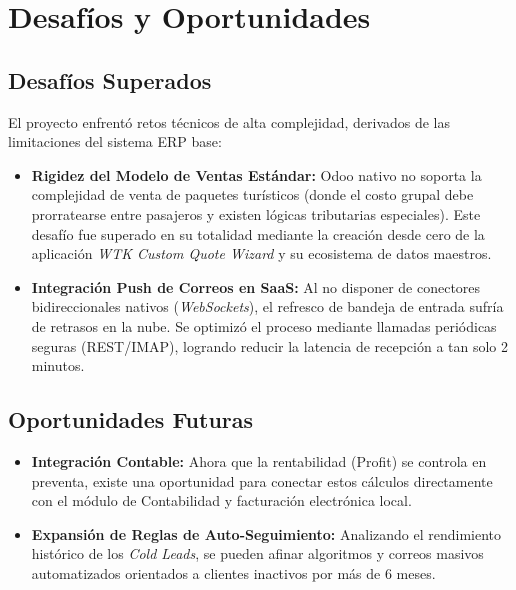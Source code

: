 \section{Desafíos y Oportunidades}

\subsection{Desafíos Superados}
El proyecto enfrentó retos técnicos de alta complejidad, derivados de las limitaciones del sistema ERP base:

\begin{itemize}
    \item \textbf{Rigidez del Modelo de Ventas Estándar:} Odoo nativo no soporta la complejidad de venta de paquetes turísticos (donde el costo grupal debe prorratearse entre pasajeros y existen lógicas tributarias especiales). Este desafío fue superado en su totalidad mediante la creación desde cero de la aplicación \textit{WTK Custom Quote Wizard} y su ecosistema de datos maestros.
    \item \textbf{Integración Push de Correos en SaaS:} Al no disponer de conectores bidireccionales nativos (\textit{WebSockets}), el refresco de bandeja de entrada sufría de retrasos en la nube. Se optimizó el proceso mediante llamadas periódicas seguras (REST/IMAP), logrando reducir la latencia de recepción a tan solo 2 minutos.
\end{itemize}

\subsection{Oportunidades Futuras}
\begin{itemize}
    \item \textbf{Integración Contable:} Ahora que la rentabilidad (Profit) se controla en preventa, existe una oportunidad para conectar estos cálculos directamente con el módulo de Contabilidad y facturación electrónica local.
    \item \textbf{Expansión de Reglas de Auto-Seguimiento:} Analizando el rendimiento histórico de los \textit{Cold Leads}, se pueden afinar algoritmos y correos masivos automatizados orientados a clientes inactivos por más de 6 meses.
\end{itemize}
